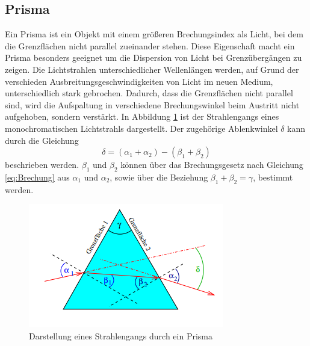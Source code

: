 \subsection{Prisma}
Ein Prisma ist ein Objekt mit einem größeren Brechungsindex als Licht, bei dem die Grenzflächen
nicht parallel zueinander stehen. Diese Eigenschaft macht ein Prisma besonders geeignet um die Dispersion von Licht bei
Grenzübergängen zu zeigen. Die Lichtstrahlen unterschiedlicher Wellenlängen werden, auf Grund der verschieden Ausbreitungsgeschwindigkeiten
von Licht im neuen Medium, unterschiedlich stark gebrochen. Dadurch, dass die Grenzflächen nicht parallel sind, wird die Aufspaltung in verschiedene Brechungswinkel
beim Austritt nicht aufgehoben, sondern verstärkt. In Abbildung \ref{fig:Prisma} ist der Strahlengangs eines 
monochromatischen Lichtstrahls dargestellt. Der zugehörige Ablenkwinkel $\delta$ kann
durch die Gleichung
\begin{equation}
    \delta=(\alpha_1+\alpha_2)-(\beta_1+\beta_2)
    \label{eq:Prisma}
\end{equation}
beschrieben werden. $\beta_1$ und $\beta_2$ können über das Brechungsgesetz nach Gleichung \eqref{eq:Brechung} aus $\alpha_1$
und $\alpha_2$, sowie über die Beziehung $\beta_1+\beta_2=\gamma$, bestimmt werden.
\begin{figure}
    \centering
    \includegraphics{content/Prisma.png}
    \caption{Darstellung eines Strahlengangs durch ein Prisma\cite{V400}}
    \label{fig:Prisma}
\end{figure}
